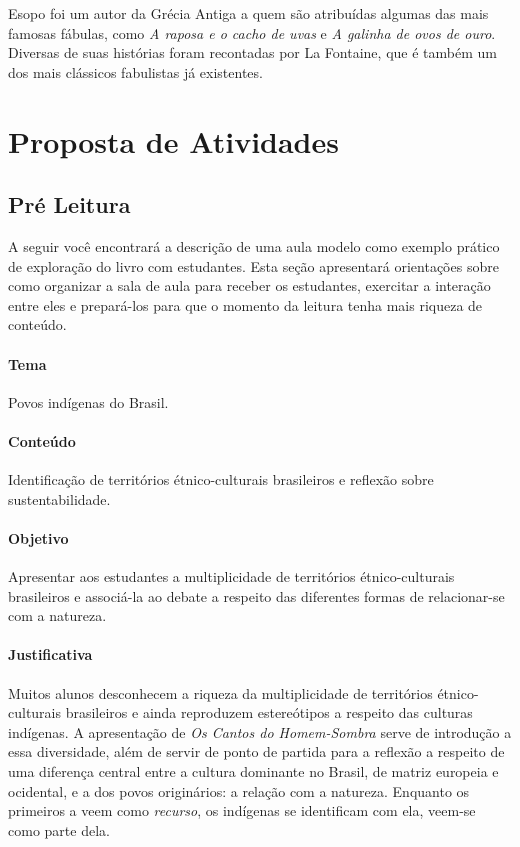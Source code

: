 \documentclass[11pt]{extarticle}
\begin{document}
Esopo foi um autor da Grécia Antiga a quem são atribuídas algumas das mais famosas fábulas, como \textit{A raposa e o cacho de uvas} e \textit{A galinha de ovos de ouro}. Diversas de suas histórias foram recontadas por La Fontaine, que é também um dos mais clássicos fabulistas já existentes.


\section{Proposta de Atividades}
\subsection{Pré Leitura}

A seguir você encontrará a descrição de uma aula modelo como exemplo prático de exploração do livro com estudantes. Esta seção apresentará orientações sobre como organizar a sala de aula para receber os estudantes, exercitar a interação entre eles e prepará-los para que o momento da leitura tenha mais riqueza de conteúdo.

\paragraph{Tema} Povos indígenas do Brasil.  

\paragraph{Conteúdo} Identificação de territórios étnico-culturais brasileiros e reflexão sobre sustentabilidade. 

\paragraph{Objetivo} Apresentar aos estudantes a multiplicidade de territórios étnico-culturais brasileiros e associá-la ao debate a respeito das diferentes formas de relacionar-se com a natureza.  

\paragraph{Justificativa} Muitos alunos desconhecem a riqueza da multiplicidade de territórios étnico-culturais brasileiros e ainda reproduzem estereótipos a respeito das culturas indígenas. A apresentação de \textit{Os Cantos do Homem-Sombra} serve de introdução a essa diversidade, além de servir de ponto de partida para a reflexão a respeito de uma diferença central entre a cultura dominante no Brasil, de matriz europeia e ocidental, e a dos povos originários: a relação com a natureza. Enquanto os primeiros a veem como \textit{recurso}, os indígenas se identificam com ela, veem-se como parte dela.      
\end{document}
